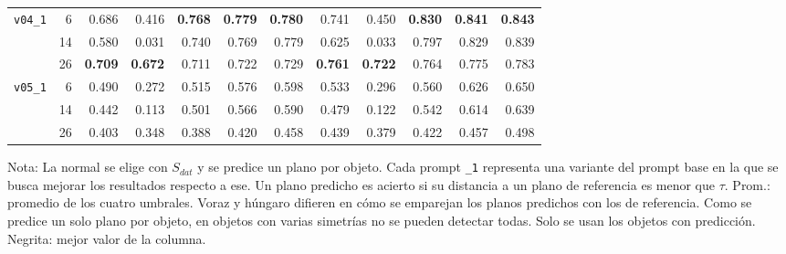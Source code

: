 \begin{table}[htbp]
\begin{lrbox}{\tablebox}
\begin{adjustbox}{max width=\textwidth}
\begin{tabular}{lrrrrrrrrrrr}
\midrule
\multirow{3}{*}{\texttt{v04\_1}} & 6 & 0.686 & 0.416 & \textbf{0.768} & \textbf{0.779} & \textbf{0.780} & 0.741 & 0.450 & \textbf{0.830} & \textbf{0.841} & \textbf{0.843} \\
 & 14 & 0.580 & 0.031 & 0.740 & 0.769 & 0.779 & 0.625 & 0.033 & 0.797 & 0.829 & 0.839 \\
 & 26 & \textbf{0.709} & \textbf{0.672} & 0.711 & 0.722 & 0.729 & \textbf{0.761} & \textbf{0.722} & 0.764 & 0.775 & 0.783 \\
\midrule
\multirow{3}{*}{\texttt{v05\_1}} & 6 & 0.490 & 0.272 & 0.515 & 0.576 & 0.598 & 0.533 & 0.296 & 0.560 & 0.626 & 0.650 \\
 & 14 & 0.442 & 0.113 & 0.501 & 0.566 & 0.590 & 0.479 & 0.122 & 0.542 & 0.614 & 0.639 \\
 & 26 & 0.403 & 0.348 & 0.388 & 0.420 & 0.458 & 0.439 & 0.379 & 0.422 & 0.457 & 0.498 \\
\bottomrule
\end{tabular}
\end{adjustbox}
\end{lrbox}
\usebox{\tablebox}

\vspace{1.5ex}
\begin{minipage}{\wd\tablebox}
\footnotesize
Nota: La normal se elige con $S_{dat}$ y se predice un plano por objeto. Cada prompt \texttt{\_1} representa una variante del prompt base en la que se busca mejorar los resultados respecto a ese. Un plano predicho es acierto si su distancia a un plano de referencia es menor que $\tau$. Prom.: promedio de los cuatro umbrales. Voraz y húngaro difieren en cómo se emparejan los planos predichos con los de referencia. Como se predice un solo plano por objeto, en objetos con varias simetrías no se pueden detectar todas. Solo se usan los objetos con predicción. Negrita: mejor valor de la columna.
\end{minipage}
\end{table}

\clearpage


